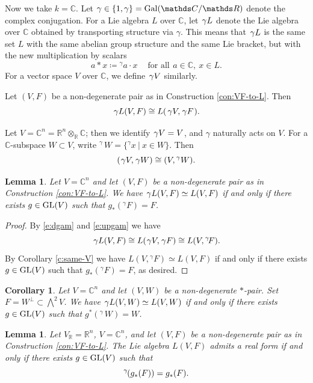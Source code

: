 \documentclass[11pt]{amsart}
\theoremstyle{plain}
\newtheorem{lemma}[theorem]{Lemma}
\newtheorem{corollary}[theorem]{Corollary}
\theoremstyle{definition}
\newcommand{\hs}{\kern 0.8pt}
\newcommand{\C}{{\mathds C}}
\newcommand{\R}{{\mathds R}}
\newcommand{\GL}{{\rm GL}}
\newcommand{\upgam}{{{}^\gamma\!}}
\renewcommand{\Lambda}{\textstyle\bigwedge}
\newcommand{\dgam}{{\hs{\gamma}}}
\begin{document}
Now we take $k=\C$. Let $\gamma\in \{1,\gamma\}={\rm Gal}(\C/\R)$
denote the complex conjugation.
For a Lie algebra $L$ over $\C$, let $\dgam L$
denote the Lie algebra over $\C$ obtained by transporting structure via $\gamma$.
This means that $\dgam L$ is the same set $L$
with the same abelian group structure and the same Lie bracket,
but with the new multiplication by scalars
\[ a*x\coloneqq\upgam a\cdot x\quad\ \text{for all}\ \,a\in \C,\ x\in L.\]
For a vector space $V$ over $\C$, we define $\dgam V$ similarly.

Let $(V,F)$ be a non-degenerate pair as in Construction \ref{con:VF-to-L}.
Then
\begin{equation}\label{e:dgam}
\dgam L(V,F)\cong L(\hs\dgam V, \dgam F\hs).
\end{equation}

Let $V=\C^n=\R^n\otimes_\R\C$; then we identify $\dgam V=V$,
and $\gamma$ naturally acts on $V$.
For a $\C$-subspace $W\subset V$, write $\upgam\, W=\{\upgam x \ |\ x\in W\}$.
Then
\begin{equation}\label{e:upgam}
(\dgam V,\dgam W)\cong(V,\upgam\, W).
\end{equation}

\begin{lemma}\label{l:gamma-L}
Let $V=\C^n$ and let $(V,F)$ be a non-degenerate pair as in Construction \ref{con:VF-to-L}.
We have $\dgam L(V,F)\simeq L(V,F)$ if and only if
there exists $g\in\GL(V)$ such that $g_*(\upgam F)=F$.
\end{lemma}

\begin{proof}
By \eqref{e:dgam} and \eqref{e:upgam} we have
\[ \dgam L(V,F)\cong L(\dgam V, \dgam F)\cong L(V, \upgam F).\]
By Corollary \ref{c:same-V} we have $L(V, \upgam F)\simeq L(V,F)$
if and only if there exists $g\in\GL(V)$
such that $g_*(\upgam F)=F$, as desired.
\end{proof}

\begin{corollary}\label{c:gamma-L}
Let $V=\C^n$ and let $(V,W)$ be a non-degenerate $*$-pair. Set $F=W^\bot\subset\Lambda^2 V$.
We have $\dgam L(V,W)\simeq L(V,W)$ if and only if
there exists $g\in\GL(V)$ such that $g^*(\upgam\, W)=W$.
\end{corollary}

\begin{lemma}\label{l:real-form}
Let $V_\R=\R^n$, $V=\C^n$, and let $(V,F)$ be a non-degenerate pair as in Construction \ref{con:VF-to-L}.
The Lie algebra $L(V,F)$ admits a real form
if and only if there exists $g\in\GL(V)$
such that
\begin{equation}\label{e:exist-real}
\upgam\hs(g_*(F))= g_*(F).
\end{equation}
\end{lemma}
\end{document}
